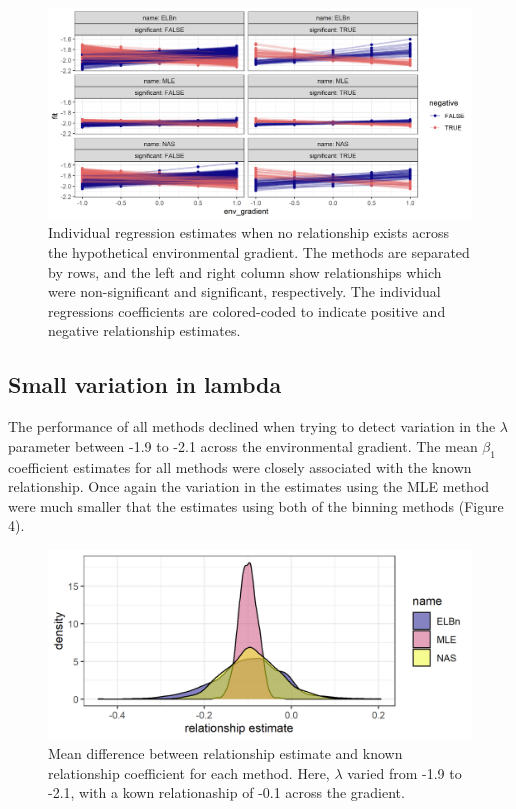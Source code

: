 \documentclass[
]{article}
\begin{document}
\begin{figure}
\centering
\includegraphics{figures/static_b_lambda_spaghetti.png}
\caption{Individual regression estimates when no relationship exists
across the hypothetical environmental gradient. The methods are
separated by rows, and the left and right column show relationships
which were non-significant and significant, respectively. The individual
regressions coefficients are colored-coded to indicate positive and
negative relationship estimates.}
\end{figure}

\hypertarget{small-variation-in-lambda}{%
\subsection{Small variation in lambda}\label{small-variation-in-lambda}}

The performance of all methods declined when trying to detect variation
in the \(\lambda\) parameter between -1.9 to -2.1 across the
environmental gradient. The mean \(\beta_1\) coefficient estimates for
all methods were closely associated with the known relationship. Once
again the variation in the estimates using the MLE method were much
smaller that the estimates using both of the binning methods (Figure 4).

\begin{figure}
\centering
\includegraphics{figures/PLB_sim_small_relationship_density.png}
\caption{Mean difference between relationship estimate and known
relationship coefficient for each method. Here, \(\lambda\) varied from
-1.9 to -2.1, with a kown relationaship of -0.1 across the gradient.}
\end{figure}
\end{document}
